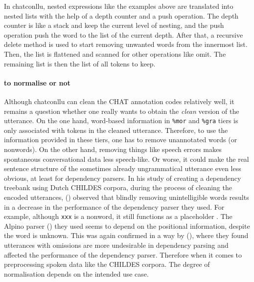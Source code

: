 
In chatconllu, nested expressions like the examples above are translated into nested lists with the help of a depth counter and a push operation. The depth counter is like a stack and keep the current level of nesting, and the push operation push the word to the list of the current depth. After that, a recursive delete method is used to start removing unwanted words from the innermost list. Then, the list is flattened and scanned for other operations like omit. The remaining list is then the list of all tokens to keep.
\clearpage
\paragraph{to normalise or not} Although chatconllu can clean the CHAT annotation codes relatively well, it remains a question whether one really wants to obtain the \emph{clean} version of the utterance. On the one hand, word-based information in \texttt{\%mor} and \texttt{\%gra} tiers is only associated with tokens in the cleaned utterance. Therefore, to use the information provided in these tiers, one has to remove unannotated words (or nonwords). On the other hand, removing things like speech errors makes spontaneous conversational data less speech-like. Or worse, it could make the real sentence structure of the sometimes already ungrammatical utterance even less obvious, at least for dependency parsers. In his study of creating a dependency treebank using Dutch CHILDES corpora, during the process of cleaning the encoded utterances, (\cite{odijk2018anncor}) observed that blindly removing unintelligible words results in a decrease in the performance of the dependency parser they used. For example, although \texttt{xxx} is a nonword, it still functions as a placeholder . The Alpino parser (\cite{bouma}) they used seems to depend on the positional information, despite the word is unknown. This was again confirmed in a way by (\cite{liu2021}), where they found utterances with omissions are more undesirable in dependency parsing and affected the performance of the dependency parser. Therefore when it comes to preprocessing spoken data like the CHILDES corpora. The degree of normalisation depends on the intended use case.


